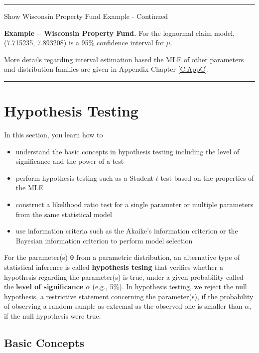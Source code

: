 \documentclass[]{book}
\providecommand{\tightlist}{%
  \setlength{\itemsep}{0pt}\setlength{\parskip}{0pt}}
\theoremstyle{definition}
\theoremstyle{definition}
\theoremstyle{definition}
\theoremstyle{remark}
\begin{document}
\begin{center}\rule{0.5\linewidth}{\linethickness}\end{center}

Show Wisconsin Property Fund Example - Continued

\hypertarget{EXM:S1:CI}{}
\textbf{Example -- Wisconsin Property Fund.} For the lognormal claim
model, (7.715235, 7.893208) is a 95\% confidence interval for \(\mu\).

More details regarding interval estimation based the MLE of other
parameters and distribution families are given in Appendix Chapter
\ref{C:AppC}.

\begin{center}\rule{0.5\linewidth}{\linethickness}\end{center}

\section{Hypothesis Testing}\label{S:AppA:HT}

In this section, you learn how to

\begin{itemize}
\tightlist
\item
  understand the basic concepts in hypothesis testing including the
  level of significance and the power of a test
\item
  perform hypothesis testing such as a Student-\(t\) test based on the
  properties of the MLE
\item
  construct a likelihood ratio test for a single parameter or multiple
  parameters from the same statistical model
\item
  use information criteria such as the Akaike's information criterion or
  the Bayesian information criterion to perform model selection
\end{itemize}

For the parameter(s) \(\boldsymbol{\theta}\) from a parametric
distribution, an alternative type of statistical inference is called
\textbf{hypothesis tesing} that verifies whether a hypothesis regarding
the parameter(s) is true, under a given probability called the
\textbf{level of significance} \(\alpha\) (e.g., 5\%). In hypothesis
testing, we reject the null hypothesis, a restrictive statement
concerning the parameter(s), if the probability of observing a random
sample as extremal as the observed one is smaller than \(\alpha\), if
the null hypothesis were true.

\subsection{Basic Concepts}\label{basic-concepts}
\end{document}

